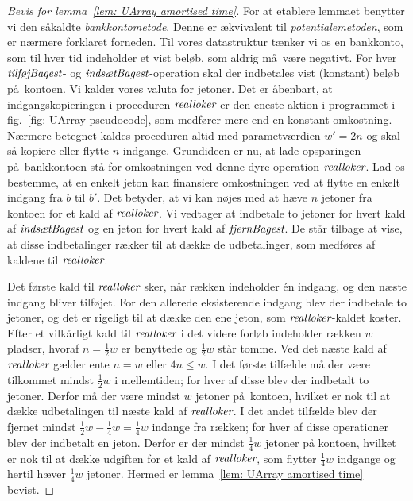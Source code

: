 \begin{proof}[Bevis for lemma~\ref{lem: UArray amortised time}]
  For at etablere lemmaet benytter vi den såkaldte \emph{bankkontometode}.
Denne er ækvivalent til \emph{potentialemetoden}, som er nærmere forklaret forneden.
Til vores datastruktur tænker vi os en bankkonto, som til hver tid indeholder et vist beløb, som aldrig må være negativt.
For hver $\operatorname{\emph{tilføjBagest}}$- og $\operatorname{\emph{indsætBagest}}$-operation skal der indbetales vist (konstant) beløb på kontoen.
Vi kalder vores valuta for jetoner.
Det er åbenbart, at indgangskopieringen i proceduren $\operatorname{\emph{realloker}}$ er den eneste aktion i programmet i fig.~\ref{fig: UArray pseudocode}, som medfører mere end en konstant omkostning.
Nærmere betegnet kaldes proceduren altid med parametværdien $w'=2n$ og skal så kopiere eller flytte $n$ indgange.
Grundideen er nu, at lade opsparingen på bankkontoen stå for omkostningen ved denne dyre operation $\operatorname{\emph{realloker}}$.
Lad os bestemme, at en enkelt jeton kan finansiere omkostningen ved at flytte en enkelt indgang fra $b$ til $b'$.
Det betyder, at vi kan nøjes med at hæve $n$ jetoner fra kontoen for et kald af $\operatorname{\emph{realloker}}$.
Vi vedtager at indbetale to jetoner for hvert kald af $\operatorname{\emph{indsætBagest}}$ og en jeton for hvert kald af $\operatorname{\emph{fjernBagest}}$.
De står tilbage at vise, at disse indbetalinger rækker til at dække de udbetalinger, som medføres af kaldene til $\operatorname{\emph{realloker}}$.

Det første kald til $\operatorname{\emph{realloker}}$ sker, når rækken indeholder én indgang, og den næste indgang bliver tilføjet.
For den allerede eksisterende indgang blev der indbetale to jetoner, og det er rigeligt til at dække den ene jeton, som $\operatorname{\emph{realloker}}$-kaldet koster.
Efter et vilkårligt kald til $\operatorname{\emph{realloker}}$ i det videre forløb indeholder rækken $w$ pladser, hvoraf $n=\frac{1}{2}w$ er benyttede og $\frac{1}{2}w$ står tomme.
Ved det næste kald af $\operatorname{\emph{realloker}}$ gælder ente $n=w$ eller $4n\leq w$.
I det første tilfælde må der være tilkommet mindst $\frac{1}{2}w$ i mellemtiden; for hver af disse blev der indbetalt to jetoner.
Derfor må der være mindst $w$ jetoner på kontoen, hvilket er nok til at dække udbetalingen til næste kald af $\operatorname{\emph{realloker}}$.
I det andet tilfælde blev der fjernet mindst $\frac{1}{2}w-\frac{1}{4}w=\frac{1}{4}w$ indange fra rækken; for hver af disse operationer blev der indbetalt en jeton.
Derfor er der mindst $\frac{1}{4}w$ jetoner på kontoen, hvilket er nok til at dække udgiften for et kald af $\operatorname{\emph{realloker}}$, som flytter $\frac{1}{4}w$ indgange og hertil hæver $\frac{1}{4}w$ jetoner.
Hermed er lemma~\ref{lem: UArray amortised time} bevist.
\end{proof}
